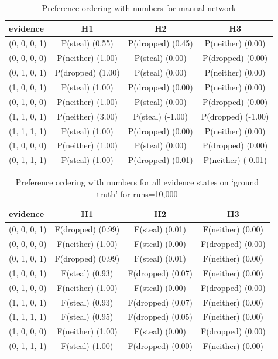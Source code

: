 \documentclass[12pt]{article}
\begin{document}
\begin{table}
\centering
\small
\begin{tabular}{|l|c|c|c|}
\hline
evidence & H1 & H2 & H3 \\
\hline
(0, 0, 0, 1)&P(steal) (0.55) & P(dropped) (0.45) & P(neither) (0.00) \\
(0, 0, 0, 0)&P(neither) (1.00) & P(steal) (0.00) & P(dropped) (0.00) \\
(0, 1, 0, 1)&P(dropped) (1.00) & P(steal) (0.00) & P(neither) (0.00) \\
(1, 0, 0, 1)&P(steal) (1.00) & P(dropped) (0.00) & P(neither) (0.00) \\
(0, 1, 0, 0)&P(neither) (1.00) & P(steal) (0.00) & P(dropped) (0.00) \\
(1, 1, 0, 1)&P(neither) (3.00) & P(steal) (-1.00) & P(dropped) (-1.00) \\
(1, 1, 1, 1)&P(steal) (1.00) & P(dropped) (0.00) & P(neither) (0.00) \\
(1, 0, 0, 0)&P(neither) (1.00) & P(steal) (0.00) & P(dropped) (0.00) \\
(0, 1, 1, 1)&P(steal) (1.00) & P(dropped) (0.01) & P(neither) (-0.01) \\
\hline
\end{tabular}
\caption{ Preference ordering with numbers for manual network}
\label{wife}
\end{table}%
\begin{table}
\centering
\small
\begin{tabular}{|l|c|c|c|}
\hline
evidence & H1 & H2 & H3 \\
\hline
(0, 0, 0, 1)&F(dropped) (0.99) & F(steal) (0.01) & F(neither) (0.00) \\
(0, 0, 0, 0)&F(neither) (1.00) & F(steal) (0.00) & F(dropped) (0.00) \\
(0, 1, 0, 1)&F(dropped) (0.99) & F(steal) (0.01) & F(neither) (0.00) \\
(1, 0, 0, 1)&F(steal) (0.93) & F(dropped) (0.07) & F(neither) (0.00) \\
(0, 1, 0, 0)&F(neither) (1.00) & F(steal) (0.00) & F(dropped) (0.00) \\
(1, 1, 0, 1)&F(steal) (0.93) & F(dropped) (0.07) & F(neither) (0.00) \\
(1, 1, 1, 1)&F(steal) (0.95) & F(dropped) (0.05) & F(neither) (0.00) \\
(1, 0, 0, 0)&F(neither) (1.00) & F(steal) (0.00) & F(dropped) (0.00) \\
(0, 1, 1, 1)&F(steal) (1.00) & F(dropped) (0.00) & F(neither) (0.00) \\
\hline
\end{tabular}
\caption{ Preference ordering with numbers for all evidence states on `ground truth' for runs=10,000}
\label{heretic}
\end{table}
\end{document}
